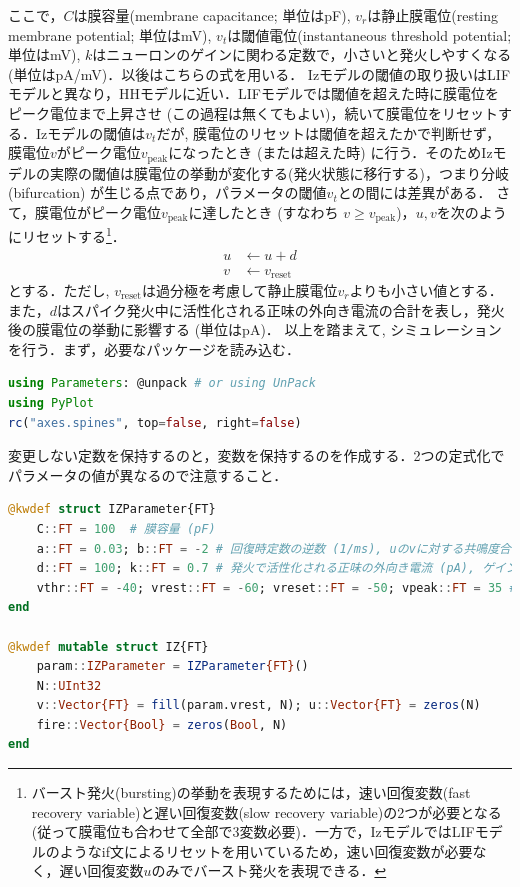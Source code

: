 ここで，$C$は膜容量(membrane capacitance; 単位はpF), $v_r$は静止膜電位(resting membrane potential; 単位はmV), $v_t$は閾値電位(instantaneous threshold potential; 単位はmV), $k$はニューロンのゲインに関わる定数で，小さいと発火しやすくなる (単位はpA/mV)．以後はこちらの式を用いる．
Izモデルの閾値の取り扱いはLIFモデルと異なり，HHモデルに近い．LIFモデルでは閾値を超えた時に膜電位をピーク電位まで上昇させ (この過程は無くてもよい)，続いて膜電位をリセットする．Izモデルの閾値は$v_t$だが, 膜電位のリセットは閾値を超えたかで判断せず，膜電位$v$がピーク電位$v_{\text{peak}}$になったとき (または超えた時) に行う．そのためIzモデルの実際の閾値は膜電位の挙動が変化する(発火状態に移行する)，つまり分岐(bifurcation) が生じる点であり，パラメータの閾値$v_t$との間には差異がある．
さて，膜電位がピーク電位$v_{\text{peak}}$に達したとき (すなわち  $v \geq v_{\text{peak}}$)，$u, v$を次のようにリセットする\footnote{バースト発火(bursting)の挙動を表現するためには，速い回復変数(fast recovery variable)と遅い回復変数(slow recovery variable)の2つが必要となる(従って膜電位も合わせて全部で3変数必要)．一方で，IzモデルではLIFモデルのようなif文によるリセットを用いているため，速い回復変数が必要なく，遅い回復変数$u$のみでバースト発火を表現できる．}．
\begin{align} 
u&\leftarrow u+d\\
v&\leftarrow v_{\text{reset}}
\end{align}
とする．ただし, $v_{\text{reset}}$は過分極を考慮して静止膜電位$v_r$よりも小さい値とする．また，$d$はスパイク発火中に活性化される正味の外向き電流の合計を表し，発火後の膜電位の挙動に影響する (単位はpA)．
以上を踏まえて, シミュレーションを行う．まず，必要なパッケージを読み込む．
\begin{lstlisting}[language=julia]
using Parameters: @unpack # or using UnPack
using PyPlot
rc("axes.spines", top=false, right=false)
\end{lstlisting}
変更しない定数を保持するのと，変数を保持するのを作成する．2つの定式化でパラメータの値が異なるので注意すること．
\begin{lstlisting}[language=julia]
@kwdef struct IZParameter{FT}
    C::FT = 100  # 膜容量 (pF)
    a::FT = 0.03; b::FT = -2 # 回復時定数の逆数 (1/ms), uのvに対する共鳴度合い (pA/mV)
    d::FT = 100; k::FT = 0.7 # 発火で活性化される正味の外向き電流 (pA), ゲイン (pA/mV)
    vthr::FT = -40; vrest::FT = -60; vreset::FT = -50; vpeak::FT = 35 #　閾値電位, 静止膜電位, リセット電位, ピーク電位 (mV)
end

@kwdef mutable struct IZ{FT}
    param::IZParameter = IZParameter{FT}()
    N::UInt32
    v::Vector{FT} = fill(param.vrest, N); u::Vector{FT} = zeros(N)
    fire::Vector{Bool} = zeros(Bool, N)
end
\end{lstlisting}
